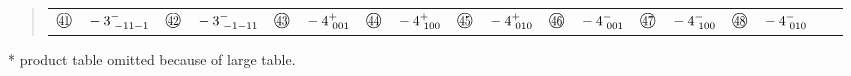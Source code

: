 \documentclass[fleqn,10pt,landscape]{jsarticle}
\begin{document}
\begin{quote}
\begin{tabular}{llllllllll}
$ {\ooalign{\hfil\resizebox{.8\width}{\height}{41}\hfil\crcr\raise.1ex\hbox{\large$\bigcirc$}}}\quad -3^{-}_{\,\,-11-1} $ & $ {\ooalign{\hfil\resizebox{.8\width}{\height}{42}\hfil\crcr\raise.1ex\hbox{\large$\bigcirc$}}}\quad -3^{-}_{\,\,-1-11} $ & $ {\ooalign{\hfil\resizebox{.8\width}{\height}{43}\hfil\crcr\raise.1ex\hbox{\large$\bigcirc$}}}\quad -4^{+}_{\,\,001} $ & $ {\ooalign{\hfil\resizebox{.8\width}{\height}{44}\hfil\crcr\raise.1ex\hbox{\large$\bigcirc$}}}\quad -4^{+}_{\,\,100} $ & $ {\ooalign{\hfil\resizebox{.8\width}{\height}{45}\hfil\crcr\raise.1ex\hbox{\large$\bigcirc$}}}\quad -4^{+}_{\,\,010} $ & $ {\ooalign{\hfil\resizebox{.8\width}{\height}{46}\hfil\crcr\raise.1ex\hbox{\large$\bigcirc$}}}\quad -4^{-}_{\,\,001} $ & $ {\ooalign{\hfil\resizebox{.8\width}{\height}{47}\hfil\crcr\raise.1ex\hbox{\large$\bigcirc$}}}\quad -4^{-}_{\,\,100} $ & $ {\ooalign{\hfil\resizebox{.8\width}{\height}{48}\hfil\crcr\raise.1ex\hbox{\large$\bigcirc$}}}\quad -4^{-}_{\,\,010} $ & $  $ & $  $
\end{tabular}
\end{quote}

* product table
\quad\quad omitted because of large table.

\newpage
\end{document}
